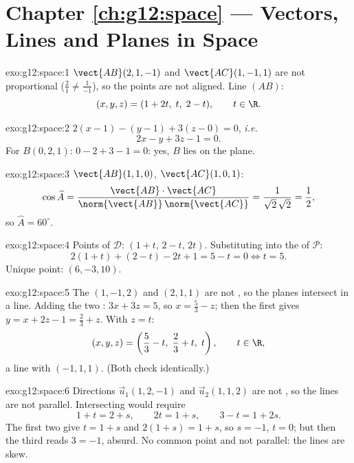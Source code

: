 \section*{Chapter \ref{ch:g12:space} --- Vectors, Lines and Planes in Space}

\begin{solution}{exo:g12:space:1}
$\vect{AB}(2, 1, -1)$ and $\vect{AC}(1, -1, 1)$ are not proportional
($\frac21 \neq \frac{1}{-1}$), so the points are not aligned. Line $(AB)$:
\[
(x, y, z) = (1 + 2t,\; t,\; 2 - t), \qquad t \in \R .
\]
\end{solution}

\begin{solution}{exo:g12:space:2}
$2(x - 1) - (y - 1) + 3(z - 0) = 0$, \emph{i.e.}
\[
2x - y + 3z - 1 = 0 .
\]
For $B(0,2,1)$: $0 - 2 + 3 - 1 = 0$: yes, $B$ lies on the plane.
\end{solution}

\begin{solution}{exo:g12:space:3}
$\vect{AB}(1,1,0)$, $\vect{AC}(1,0,1)$:
\[
\cos\widehat{A}
= \frac{\vect{AB}\cdot\vect{AC}}{\norm{\vect{AB}}\,\norm{\vect{AC}}}
= \frac{1}{\sqrt2\,\sqrt2} = \frac12,
\]
so $\widehat A = 60^\circ$.
\end{solution}

\begin{solution}{exo:g12:space:4}
Points of $\mathcal D$: $(1 + t,\, 2 - t,\, 2t)$. Substituting into the
 of $\mathcal P$:
\[
2(1+t) + (2 - t) - 2t + 1 = 5 - t = 0 \iff t = 5 .
\]
Unique  point: $(6, -3, 10)$.
\end{solution}

\begin{solution}{exo:g12:space:5}
The  $(1, -1, 2)$ and $(2, 1, 1)$ are not , so the
planes intersect in a line. Adding the two : $3x + 3z = 5$, so
$x = \frac53 - z$; then the first  gives
$y = x + 2z - 1 = \frac23 + z$. With $z = t$:
\[
(x, y, z) = \left(\frac53 - t,\; \frac23 + t,\; t\right), \qquad t \in \R,
\]
a line with  $(-1, 1, 1)$. (Both  check
identically.)
\end{solution}

\begin{solution}{exo:g12:space:6}
Directions $\vec u_1(1, 2, -1)$ and $\vec u_2(1, 1, 2)$ are not ,
so the lines are not parallel. Intersecting would require
\[
1 + t = 2 + s, \qquad 2t = 1 + s, \qquad 3 - t = 1 + 2s .
\]
The first two give $t = 1 + s$ and $2(1+s) = 1 + s$, so $s = -1$, $t = 0$;
but then the third reads $3 = -1$, absurd. No common point and not
parallel: the lines are skew.
\end{solution}

